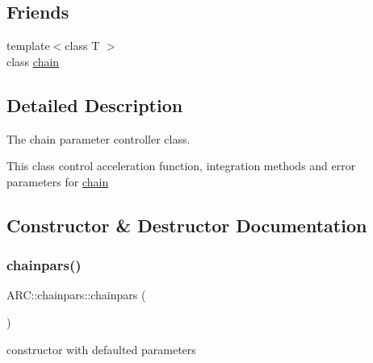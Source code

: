 \subsection*{Friends}
\begin{DoxyCompactItemize}
\item 
{\footnotesize template$<$class T $>$ }\\class \hyperlink{classARC_1_1chainpars_a498fbb4337b9878a5f0044996e4a2489}{chain}
\end{DoxyCompactItemize}


\subsection{Detailed Description}
The chain parameter controller class. 

This class control acceleration function, integration methods and error parameters for \hyperlink{classARC_1_1chain}{chain} 

\subsection{Constructor \& Destructor Documentation}
\hypertarget{classARC_1_1chainpars_a2019a609d85e2b801f306ac8c7f268ab}{}\label{classARC_1_1chainpars_a2019a609d85e2b801f306ac8c7f268ab} 
\subsubsection{\texorpdfstring{chainpars()}{chainpars()}\hspace{0.1cm}{\footnotesize\ttfamily [1/2]}}
{\footnotesize\ttfamily A\+R\+C\+::chainpars\+::chainpars (\begin{DoxyParamCaption}{ }\end{DoxyParamCaption})\hspace{0.3cm}{\ttfamily [inline]}}



constructor with defaulted parameters 


